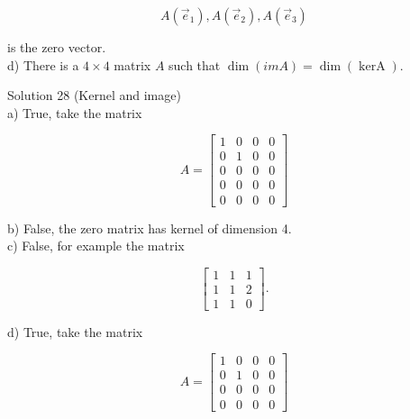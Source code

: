 \documentclass[10pt]{article}
\begin{document}
$$
A\left(\vec{e}_{1}\right), A\left(\vec{e}_{2}\right), A\left(\vec{e}_{3}\right)
$$

is the zero vector.\\
d) There is a $4 \times 4$ matrix $A$ such that $\operatorname{dim}(i m A)=\operatorname{dim}(\operatorname{kerA})$.

Solution 28 (Kernel and image)\\
a) True, take the matrix

$$
A=\left[\begin{array}{llll}
1 & 0 & 0 & 0 \\
0 & 1 & 0 & 0 \\
0 & 0 & 0 & 0 \\
0 & 0 & 0 & 0 \\
0 & 0 & 0 & 0
\end{array}\right]
$$

b) False, the zero matrix has kernel of dimension 4.\\
c) False, for example the matrix

$$
\left[\begin{array}{lll}
1 & 1 & 1 \\
1 & 1 & 2 \\
1 & 1 & 0
\end{array}\right] .
$$

d) True, take the matrix

$$
A=\left[\begin{array}{llll}
1 & 0 & 0 & 0 \\
0 & 1 & 0 & 0 \\
0 & 0 & 0 & 0 \\
0 & 0 & 0 & 0
\end{array}\right]
$$
\end{document}
